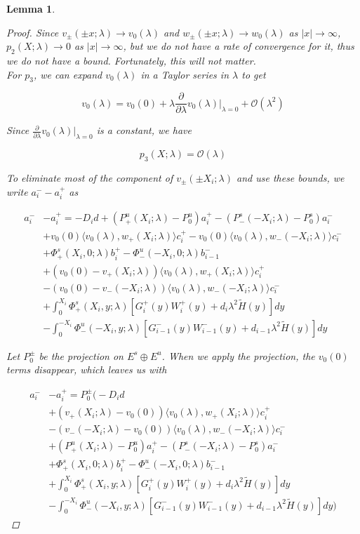\documentclass[12pt]{article}
\newtheorem{lemma}{Lemma}
\begin{document}
\begin{lemma}
\begin{proof}
Since $v_\pm(\pm x; \lambda) \rightarrow v_0(\lambda)$ and $w_\pm(\pm x; \lambda) \rightarrow w_0(\lambda)$ as $|x| \rightarrow \infty$, $p_2(X; \lambda) \rightarrow 0$ as $|x| \rightarrow \infty$, but we do not have a rate of convergence for it, thus we do not have a bound. Fortunately, this will not matter.\\

For $p_3$, we can expand $v_0(\lambda)$ in a Taylor series in $\lambda$ to get

\[
v_0(\lambda) = v_0(0) + \lambda \frac{\partial}{\partial \lambda}v_0(\lambda)\Big|_{\lambda = 0} + \mathcal{O}(\lambda^2)
\]

Since $\frac{\partial}{\partial \lambda}v_0(\lambda)\Big|_{\lambda = 0}$ is a constant, we have

\[
p_3(X; \lambda) = \mathcal{O}(\lambda) 
\]

To eliminate most of the component of $v_\pm(\pm X_i; \lambda)$ and use these bounds, we write $a_i^- - a_i^+$ as

\begin{align*}
a_i^- &- a_i^+ = -D_i d + (P^u_+(X_i; \lambda) - P_0^u)a_i^+ - (P^s_-(-X_i; \lambda) - P_0^s)a_i^- \\
&+ v_0(0) \langle v_0(\lambda), w_+(X_i; \lambda) \rangle c_i^+ 
- v_0(0) \langle v_0(\lambda), w_-(-X_i; \lambda) \rangle c_i^- \\
&+ \Phi^s_+(X_i, 0; \lambda)b_i^+ - \Phi^u_-(-X_i, 0; \lambda)b_{i-1}^- \\
&+ (v_0(0) - v_+(X_i; \lambda)) \langle v_0(\lambda), w_+(X_i; \lambda) \rangle c_i^+ \\
&- (v_0(0) - v_-(-X_i; \lambda)) \langle v_0(\lambda), w_-(-X_i; \lambda) \rangle c_i^- \\
&+ \int_0^{X_i} \Phi^s_+(X_i, y; \lambda) [ G_i^+(y) W_i^+(y) + d_i \lambda^2 \tilde{H}(y) ] dy \\
&- \int_0^{-X_i} \Phi^u_-(-X_i, y; \lambda) [ G_{i-1}^-(y) W_{i-1}^-(y) + d_{i-1} \lambda^2 \tilde{H}(y) ] dy
\end{align*}

Let $P_0^\pm$ be the projection on $E^s \oplus E^u$. When we apply the projection, the $v_0(0)$ terms disappear, which leaves us with

\begin{align*}
a_i^- &- a_i^+ = P_0^\pm \Big(-D_i d \\
&+(v_+(X_i; \lambda) - v_0(0)) \langle v_0(\lambda), w_+(X_i; \lambda) \rangle c_i^+ \\
&- (v_-(-X_i; \lambda) - v_0(0)) \langle v_0(\lambda), w_-(-X_i; \lambda) \rangle c_i^- \\
&+ (P^u_+(X_i; \lambda) - P_0^u)a_i^+ - (P^s_-(-X_i; \lambda) - P_0^s)a_i^- \\
&+ \Phi^s_+(X_i, 0; \lambda)b_i^+ - \Phi^u_-(-X_i, 0; \lambda)b_{i-1}^- \\
&+ \int_0^{X_i} \Phi^s_+(X_i, y; \lambda) [ G_i^+(y) W_i^+(y) + d_i \lambda^2 \tilde{H}(y) ] dy \\
&- \int_0^{-X_i} \Phi^u_-(-X_i, y; \lambda) [ G_{i-1}^-(y) W_{i-1}^-(y) + d_{i-1} \lambda^2 \tilde{H}(y) ] dy \Big)
\end{align*}


\end{proof}
\end{lemma}
\end{document}
